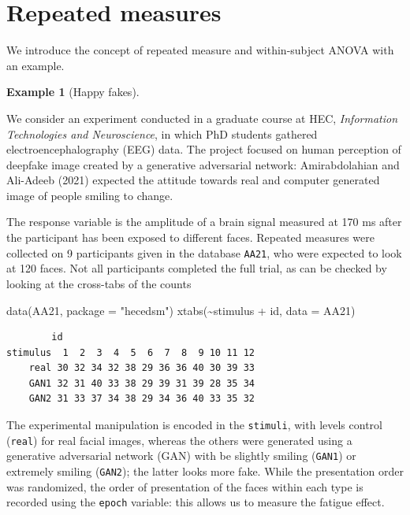 \documentclass[
  11pt,
  letterpaper,
]{scrbook}
\newenvironment{Shaded}{\begin{snugshade}}{\end{snugshade}}
\newcommand{\AttributeTok}[1]{\textcolor[rgb]{0.40,0.45,0.13}{#1}}
\newcommand{\FunctionTok}[1]{\textcolor[rgb]{0.28,0.35,0.67}{#1}}
\newcommand{\NormalTok}[1]{\textcolor[rgb]{0.00,0.23,0.31}{#1}}
\newcommand{\SpecialCharTok}[1]{\textcolor[rgb]{0.37,0.37,0.37}{#1}}
\newcommand{\StringTok}[1]{\textcolor[rgb]{0.13,0.47,0.30}{#1}}
\theoremstyle{definition}
\newtheorem{example}{Example}[chapter]
\theoremstyle{remark}
\begin{document}
\hypertarget{repeated-measures}{%
\section{Repeated measures}\label{repeated-measures}}

We introduce the concept of repeated measure and within-subject ANOVA
with an example.

\begin{example}[Happy
fakes]\protect\hypertarget{exm-happyfakes}{}\label{exm-happyfakes}

We consider an experiment conducted in a graduate course at HEC,
\emph{Information Technologies and Neuroscience}, in which PhD students
gathered electroencephalography (EEG) data. The project focused on human
perception of deepfake image created by a generative adversarial
network: Amirabdolahian and Ali-Adeeb (2021) expected the attitude
towards real and computer generated image of people smiling to change.

The response variable is the amplitude of a brain signal measured at 170
ms after the participant has been exposed to different faces. Repeated
measures were collected on 9 participants given in the database
\texttt{AA21}, who were expected to look at 120 faces. Not all
participants completed the full trial, as can be checked by looking at
the cross-tabs of the counts

\begin{Shaded}
\begin{Highlighting}[]
\FunctionTok{data}\NormalTok{(AA21, }\AttributeTok{package =} \StringTok{"hecedsm"}\NormalTok{)}
\FunctionTok{xtabs}\NormalTok{(}\SpecialCharTok{\textasciitilde{}}\NormalTok{stimulus }\SpecialCharTok{+}\NormalTok{ id, }\AttributeTok{data =}\NormalTok{ AA21)}
\end{Highlighting}
\end{Shaded}

\begin{verbatim}
        id
stimulus  1  2  3  4  5  6  7  8  9 10 11 12
    real 30 32 34 32 38 29 36 36 40 30 39 33
    GAN1 32 31 40 33 38 29 39 31 39 28 35 34
    GAN2 31 33 37 34 38 29 34 36 40 33 35 32
\end{verbatim}

The experimental manipulation is encoded in the \texttt{stimuli}, with
levels control (\texttt{real}) for real facial images, whereas the
others were generated using a generative adversarial network (GAN) with
be slightly smiling (\texttt{GAN1}) or extremely smiling
(\texttt{GAN2}); the latter looks more fake. While the presentation
order was randomized, the order of presentation of the faces within each
type is recorded using the \texttt{epoch} variable: this allows us to
measure the fatigue effect.


\end{example}
\end{document}
